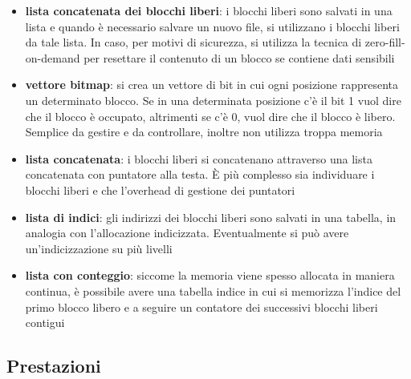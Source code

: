 \documentclass[a4paper]{article}
\begin{document}
\begin{itemize}
	\item \textbf{lista concatenata dei blocchi liberi}: 
	i blocchi liberi sono salvati in una lista e quando è necessario salvare un nuovo file, si utilizzano i blocchi liberi da tale
	lista. In caso, per motivi di sicurezza, si utilizza la tecnica di zero-fill-on-demand per resettare il contenuto di un blocco
	se contiene dati sensibili
	
	\item \textbf{vettore bitmap}: 
	si crea un vettore di bit in cui ogni posizione rappresenta un determinato blocco. Se in una determinata posizione c'è il bit 1
	vuol dire che il blocco è occupato, altrimenti se c'è 0, vuol dire che il blocco è libero. Semplice da gestire e da controllare,
	inoltre non utilizza troppa memoria
	
	\item \textbf{lista concatenata}: 
	i blocchi liberi si concatenano attraverso una lista concatenata con puntatore alla testa. È più complesso sia individuare i blocchi liberi
	e che l'overhead di gestione dei puntatori
	
	\item \textbf{lista di indici}: 
	gli indirizzi dei blocchi liberi sono salvati in una tabella, in analogia con l'allocazione indicizzata. Eventualmente si può
	avere un'indicizzazione su più livelli
	
	\item \textbf{lista con conteggio}: 
	siccome la memoria viene spesso allocata in maniera continua, è possibile avere una tabella indice in cui si memorizza l'indice
	del primo blocco libero e a seguire un contatore dei successivi blocchi liberi contigui
\end{itemize}

\newpage


\subsection{Prestazioni}
\end{document}
